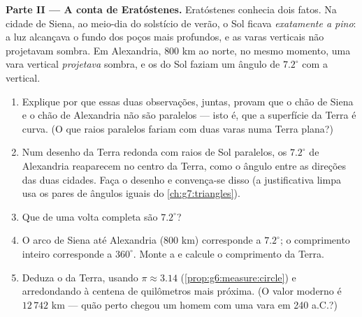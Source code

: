 \begin{problem}
\medskip
\noindent\textbf{Parte II --- A conta de Eratóstenes.}
Eratóstenes conhecia dois fatos. Na cidade de Siena, ao meio-dia do
solstício de verão, o Sol ficava \emph{exatamente a pino}: a luz
alcançava o fundo dos poços mais profundos, e as varas verticais não
projetavam sombra. Em Alexandria, $800$ km ao norte, no mesmo momento,
uma vara vertical \emph{projetava} sombra, e os  do Sol faziam um
ângulo de $7.2^\circ$ com a vertical.
\begin{enumerate}[resume]
  \item Explique por que essas duas observações, juntas, provam que o
        chão de Siena e o chão de Alexandria não são paralelos --- isto
        é, que a superfície da Terra é curva. (O que raios paralelos
        fariam com duas varas numa Terra plana?)
  \item Num desenho da Terra redonda com raios de Sol paralelos, os
        $7.2^\circ$ de Alexandria reaparecem no centro da Terra, como o
        ângulo entre as direções das duas cidades. Faça o desenho e
        convença-se disso (a justificativa limpa usa os pares de
        ângulos iguais do \cref{ch:g7:triangles}).
  \item Que  de uma volta completa são $7.2^\circ$?
  \item O arco de Siena até Alexandria ($800$ km) corresponde a
        $7.2^\circ$; o comprimento inteiro corresponde a $360^\circ$.
        Monte a  e calcule o comprimento da Terra.
  \item Deduza o  da Terra, usando $\pi \approx 3.14$
        (\cref{prop:g6:measure:circle}) e arredondando à centena de
        quilômetros mais próxima. (O valor moderno é $12\,742$ km ---
        quão perto chegou um homem com uma vara em 240 a.C.?)
\end{enumerate}


\end{problem}
